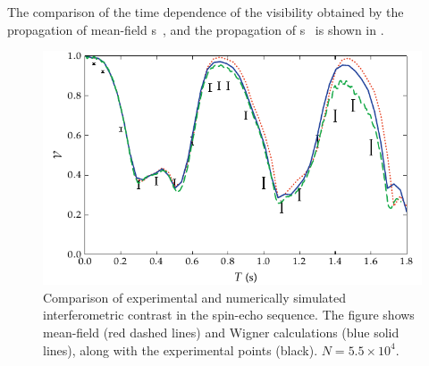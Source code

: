 The comparison of the time dependence of the visibility obtained by the propagation of mean-field s~, and the propagation of s~ is shown in .

\begin{figure}
    \centerline{\includegraphics{figures_generated/bec_noise/echo_visibility_short.pdf}}

    \caption{
    Comparison of experimental and numerically simulated interferometric contrast in the spin-echo sequence.
    The figure shows mean-field (red dashed lines) and Wigner calculations (blue solid lines), along with the experimental points (black).
    $N = 5.5 \times 10^4$.}

    \label{fig:bec-noise:visibility:echo-visibility}
\end{figure}

